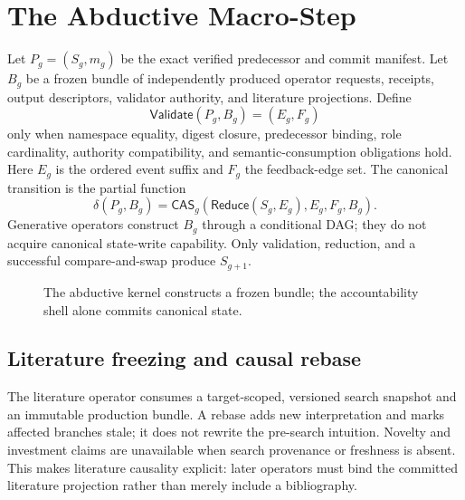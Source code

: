 \documentclass[11pt]{article}
\begin{document}
\section{The Abductive Macro-Step}

Let $P_g=(S_g,m_g)$ be the exact verified predecessor and commit manifest. Let $B_g$ be a frozen bundle of independently produced operator requests, receipts, output descriptors, validator authority, and literature projections. Define
\[
  \mathsf{Validate}(P_g,B_g)=(E_g,F_g)
\]
only when namespace equality, digest closure, predecessor binding, role cardinality, authority compatibility, and semantic-consumption obligations hold. Here $E_g$ is the ordered event suffix and $F_g$ the feedback-edge set. The canonical transition is the partial function
\[
  \delta(P_g,B_g)=
  \mathsf{CAS}_{g}\!\left(
    \mathsf{Reduce}(S_g,E_g),E_g,F_g,B_g
  \right).
\]
Generative operators construct $B_g$ through a conditional DAG; they do not acquire canonical state-write capability. Only validation, reduction, and a successful compare-and-swap produce $S_{g+1}$.

\begin{figure}[ht]
\centering
{}
\caption{The abductive kernel constructs a frozen bundle; the accountability shell alone commits canonical state.}
\end{figure}

\subsection{Literature freezing and causal rebase}

The literature operator consumes a target-scoped, versioned search snapshot and an immutable production bundle. A rebase adds new interpretation and marks affected branches stale; it does not rewrite the pre-search intuition. Novelty and investment claims are unavailable when search provenance or freshness is absent. This makes literature causality explicit: later operators must bind the committed literature projection rather than merely include a bibliography.
\end{document}
